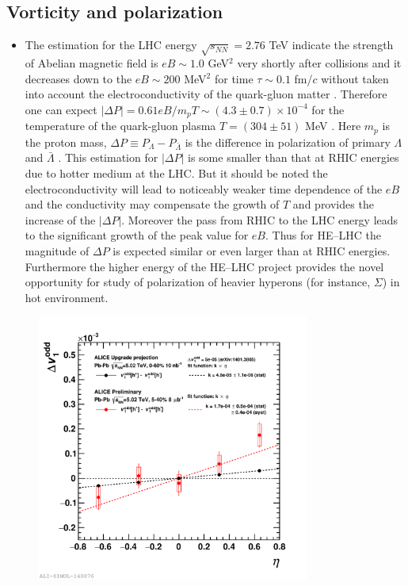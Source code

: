 \subsection{Vorticity and polarization}

\begin{itemize}
	\item
The estimation for the LHC energy $\sqrt{s_{NN}}=2.76$ TeV indicate the strength of Abelian magnetic field is $eB \sim 1.0$ GeV$^{2}$ very shortly after collisions and it decreases down to the $eB \sim 200$ MeV$^{2}$ for time $\tau \sim 0.1$ fm/$c$ without taken into account the electroconductivity of the quark-gluon matter \cite{AHEP-2014-193039-2014,JPCS-668-012129-2016,JPCS-675-022021-2016}. Therefore one can expect $|\Delta P|=0.61eB/m_{p}T \sim (4.3 \pm 0.7) \times 10^{-4}$ for the temperature of the quark-gluon plasma $T=(304 \pm 51)$ MeV \cite{NPA-904-905-573c-2013}. Here $m_{p}$ is the proton mass, $\Delta P \equiv P_{\Lambda}-P_{\bar{\Lambda}}$ is the difference in polarization of primary $\Lambda$ and $\bar{\Lambda}$ \cite{PRC-95-054902-2017}. This estimation for $|\Delta P|$ is some smaller than that at RHIC energies due to hotter medium at the LHC. But it should be noted the electroconductivity will lead to noticeably weaker time dependence of the $eB$ \cite{AHEP-2013-490495-2013} and the conductivity may compensate the growth of $T$ and provides the increase of the $|\Delta P|$. Moreover the pass from RHIC to the LHC energy leads to the significant growth of the peak value for $eB$. Thus for HE--LHC the magnitude of $\Delta P$ is expected similar or even larger than at RHIC energies. Furthermore the higher energy of the HE--LHC project provides the novel opportunity for study of polarization of heavier hyperons (for instance, $\Sigma$) in hot environment.
\end{itemize}

\begin{figure}[!htb]
\begin{center}
\includegraphics[width=0.8\textwidth]{figs/alice_projection_deltav1ch_stat8}
\caption{
}
\label{fig:alice_delta_v1}
\end{center}
\end{figure}


